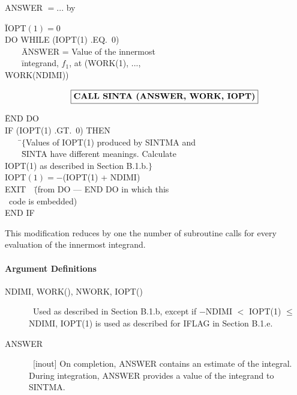 \documentclass[twoside]{MATH77}
\begin{document}
\hspace{.2in}ANSWER $= ...$\newline
by
\begin{tabbing}
\hspace{.2in}\=IOPT$(1) = 0$\\

\>DO WHILE (IOPT(1) .EQ.\ 0)\\

\>\ \ \ \ \=ANSWER = Value of the innermost\\
\>\>\ \ \ \ \=integrand, $f_1$, at (WORK(1), ...,\\
\>\>\>WORK(NDIMI))
\end{tabbing}
$$
\quad \quad \fbox{{\bf CALL SINTA (ANSWER, WORK, IOPT)}}
$$
\begin{tabbing}
\hspace{.2in}\=END DO\\

\>IF (IOPT(1) .GT.\ 0) THEN\\

\>\ \ \ \ \=$\{$Values of IOPT(1) produced by SINTMA and\\
\>\>\ \ \ \ \=SINTA have different meanings. Calculate\\
\>\>\>IOPT(1) as described in Section B.1.b.$\}$\\

\>\>IOPT$(1) = -$(IOPT(1) + NDIMI)\\

\>\>EXIT\ \  \=(from DO --- END DO in which this\\
\>\>\>\ code is embedded)\\

\>END IF
\end{tabbing}

This modification reduces by one the number of subroutine calls for every
evaluation of the innermost integrand.

\paragraph{Argument Definitions\label{ArgDefRC}}

\begin{description}
\item[NDIMI, WORK(), NWORK, IOPT()]  \ Used as described in Section
B.1.b, except if $-$NDIMI $<$ IOPT(1) $\leq $ NDIMI, IOPT(1) is used as
described for IFLAG in Section B.1.e.

\item[ANSWER]  \ [inout] On completion, ANSWER contains an estimate of the
integral. During integration, ANSWER provides a value of the integrand to
SINTMA.
\end{description}
\end{document}
